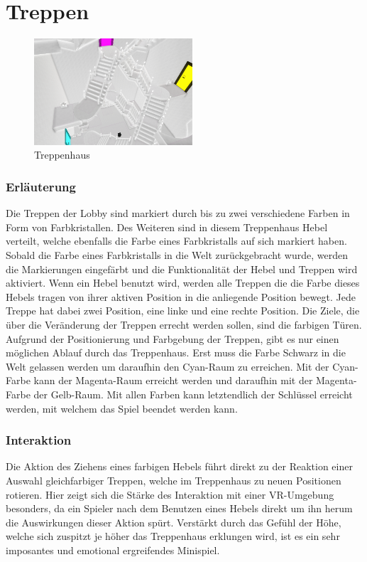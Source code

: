 \section{Treppen}
\begin{figure}
	\vspace*{-0.5cm}
	\includegraphics[width=5.9cm]{Pictures/Treppenhaus}
	\caption{Treppenhaus}
	\vspace*{-0.5cm}
	\label{fig:treppenhaus}
\end{figure}
\subsubsection{Erläuterung}
Die Treppen der Lobby sind markiert durch bis zu zwei verschiedene Farben in Form von Farbkristallen. Des Weiteren sind in diesem Treppenhaus Hebel verteilt, welche ebenfalls die Farbe eines Farbkristalls auf sich markiert haben. Sobald die Farbe eines Farbkristalls in die Welt zurückgebracht wurde, werden die Markierungen eingefärbt und die Funktionalität der Hebel und Treppen wird aktiviert. Wenn ein Hebel benutzt wird, werden alle Treppen die die Farbe dieses Hebels tragen von ihrer aktiven Position in die anliegende Position bewegt. Jede Treppe hat dabei zwei Position, eine linke und eine rechte Position. Die Ziele, die über die Veränderung der Treppen errecht werden sollen, sind die farbigen Türen. Aufgrund der Positionierung und Farbgebung der Treppen, gibt es nur einen möglichen Ablauf durch das Treppenhaus. Erst muss die Farbe Schwarz in die Welt gelassen werden um daraufhin den Cyan-Raum zu erreichen. Mit der Cyan-Farbe kann der Magenta-Raum erreicht werden und daraufhin mit der Magenta-Farbe der Gelb-Raum. Mit allen Farben kann letztendlich der Schlüssel erreicht werden, mit welchem das Spiel beendet werden kann.


\subsubsection{Interaktion}
\noindent Die Aktion des Ziehens eines farbigen Hebels führt direkt zu der Reaktion einer Auswahl gleichfarbiger Treppen, welche im Treppenhaus zu neuen Positionen rotieren. Hier zeigt sich die Stärke des Interaktion mit einer VR-Umgebung besonders, da ein Spieler nach dem Benutzen eines Hebels direkt um ihn herum die Auswirkungen dieser Aktion spürt. Verstärkt durch das Gefühl der Höhe, welche sich zuspitzt je höher das Treppenhaus erklungen wird, ist es ein sehr imposantes und emotional ergreifendes Minispiel.

